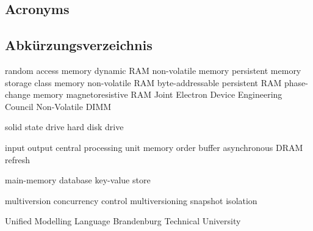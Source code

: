 %
%
%
%
\begin{en}
\chapter{Acronyms}
\end{en}
\begin{de}
\chapter{Abk\"urzungsverzeichnis}
\end{de}
\label{sec:acronyms}
%
\begin{multicols}{2}
\begin{acronym}[NVRAM]		%

	 {random access memory}
	 {dynamic RAM}
     {non-volatile memory}
     {persistent memory}
     {storage class memory}
	 {non-volatile RAM}
	 {byte-addressable persistent RAM}
     {phase-change memory}
     {magnetoresistive RAM}
     {Joint Electron Device Engineering Council}
     {Non-Volatile DIMM}

	 {solid state drive}
	 {hard disk drive}

     {input output}
     {central processing unit}
     {memory order buffer}
	 {asynchronous DRAM refresh}

     {main-memory database}
     {key-value store}

     {multiversion concurrency control}
     {multiversioning}
     {snapshot isolation}

	 {Unified Modelling Language}
	 {Brandenburg Technical University}

\end{acronym}
\end{multicols}
%
%
